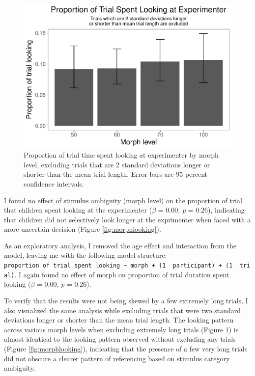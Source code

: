 \documentclass[floatsintext,man]{apa6}
\theoremstyle{definition}
\theoremstyle{definition}
\theoremstyle{definition}
\theoremstyle{remark}
\begin{document}
\begin{figure}
\centering
\includegraphics{soc_ref_category_paper_files/figure-latex/morphlookingtrimmed-1.pdf}
\caption{\label{fig:morphlookingtrimmed}Proportion of trial time spent
looking at experimenter by morph level, excluding trials that are 2
standard deviations longer or shorter than the mean trial length. Error
bars are 95 percent confidence intervals.}
\end{figure}

I found no effect of stimulus ambiguity (morph level) on the proportion
of trial that children spent looking at the experimenter (\(\beta\) =
0.00, \emph{p} = 0.26), indicating that children did not selectively
look longer at the exprimenter when faced with a more uncertain decision
(Figure \ref{fig:morphlooking}).

As an exploratory analysis, I removed the age effect and interaction
from the model, leaving me with the following model structure:
\texttt{proportion\ of\ trial\ spent\ looking\ \textasciitilde{}\ morph\ +\ (1\ \textbar{}\ participant)\ +\ (1\ \textbar{}\ trial)}.
I again found no effect of morph on proportion of trial duration spent
looking (\(\beta\) = 0.00, \emph{p} = 0.26).

To verify that the results were not being skewed by a few extremely long
trials, I also visualized the same analysis while excluding trials that
were two standard deviations longer or shorter than the mean trial
length. The looking pattern across various morph levels when excluding
extremely long trials (Figure \ref{fig:morphlookingtrimmed}) is almost
identical to the looking pattern observed without excluding any trials
(Figure \ref{fig:morphlooking}), indicating that the presence of a few
very long trials did not obscure a clearer pattern of referencing based
on stimulus category ambiguity.
\end{document}
